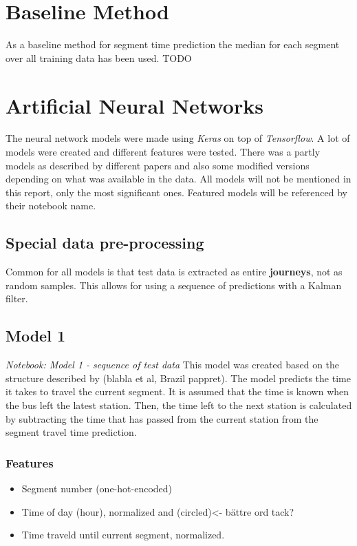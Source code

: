 \section{Baseline Method}
As a baseline method for segment time prediction the median for each segment over all training data has been used. TODO

\section{Artificial Neural Networks}
The neural network models were made using \textit{Keras} on top of \textit{Tensorflow}. A lot of models were created and different features were tested. There was a partly models as described by different papers and also some modified versions depending on what was available in the data.
All models will not be mentioned in this report, only the most significant ones. Featured models will be referenced by their notebook name.

\subsection{Special data pre-processing}
Common for all models is that test data is extracted as entire \textbf{journeys}, not as random samples. This allows for using a sequence of predictions with a Kalman filter.

\subsection{Model 1}\label{M1}
\textit{Notebook: Model 1 - sequence of test data}
\newline
\noindent This model was created based on the structure described by (blabla et al, Brazil pappret). The model predicts the time it takes to travel the current segment. It is assumed that the time is known when the bus left the latest station. Then, the time left to the next station is calculated by subtracting the time that has passed from the current station from the segment travel time prediction.

\subsubsection{Features}

\begin{itemize}
    \item Segment number (one-hot-encoded)
    \item Time of day (hour), normalized and (circled)<- bättre ord tack?
    \item Time traveld until current segment, normalized.    
\end{itemize}


